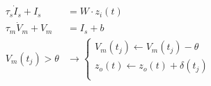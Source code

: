 \documentclass[10pt]{article}
\begin{document}
\begin{align*}\tau_{s}\dot{I}_{s} + I_{s} & = W\cdot z_i(t) \\
\tau_{m}\dot{V}_{m} + V_{m} & = I_{s} + b \\
V_m(t_j) > \theta & \rightarrow
\begin{cases}
  V_m(t_j) \leftarrow V_m(t_j) - \theta \\
  z_o(t) \leftarrow z_o(t) + \delta(t_j) \\
\end{cases}\end{align*}
\end{document}
